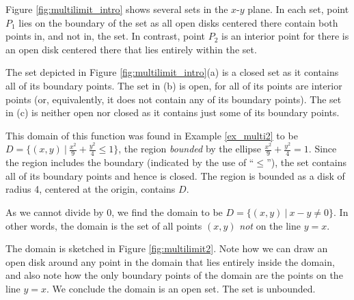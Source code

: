 Figure \ref{fig:multilimit_intro} shows several sets in the $x$-$y$ plane. In each set, point $P_1$ lies on the boundary of the set as all open disks centered there contain both points in, and not in, the set. In contrast, point $P_2$ is an interior point for there is an open disk centered there that lies entirely within the set.

The set depicted in Figure \ref{fig:multilimit_intro}(a) is a closed set as it contains all of its boundary points. The set in (b) is open, for all of its points are interior points (or, equivalently, it does not contain any of its boundary points). The set in (c) is neither open nor closed as it contains just some of its boundary points.\\
\clearpage

{This domain of this function was found in Example \ref{ex_multi2} to be $D = \{(x,y)\ |\ \frac{x^2}9+\frac{y^2}4\leq 1\}$, the region \textit{bounded} by the ellipse $\frac{x^2}9+\frac{y^2}4=1$. Since the region includes the boundary (indicated by the use of ``$\leq$''), the set contains all of its boundary points and hence is closed. The region is bounded as a disk of radius 4, centered at the origin, contains $D$.
}\\

{As we cannot divide by 0, we find the domain to be $D = \{(x,y)\ |\ x-y\neq 0\}$. In other words, the domain is the set of all points $(x,y)$ \emph{not} on the line $y=x$. 

The domain is sketched in Figure \ref{fig:multilimit2}. Note how we can draw an open disk around any point in the domain that lies entirely inside the domain, and also note how the only boundary points of the domain are the points on the line $y=x$. We conclude the domain is an open set. The set is unbounded.
}\\

